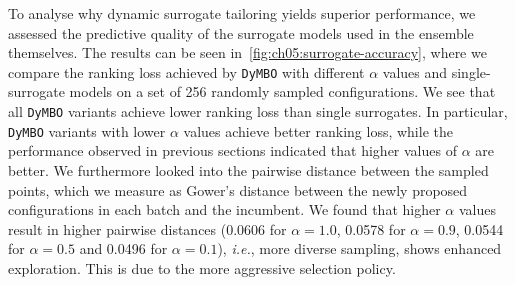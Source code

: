 To analyse why dynamic surrogate tailoring yields superior performance, we assessed the predictive quality of the surrogate models used in the ensemble themselves.
The results can be seen in~\cref{fig:ch05:surrogate-accuracy}, where we compare the ranking loss achieved by \texttt{DyMBO} with different $\alpha$ values and single-surrogate models on a set of 256 randomly sampled configurations. 
We see that all \texttt{DyMBO} variants achieve lower ranking loss than single surrogates.
In particular, \texttt{DyMBO} variants with lower $\alpha$ values achieve better ranking loss, while the performance observed in previous sections indicated that higher values of $\alpha$ are better.
We furthermore looked into the pairwise distance between the sampled points, which we measure as Gower's distance between the newly proposed configurations in each batch and the incumbent. We found that higher $\alpha$ values result in higher pairwise distances (0.0606 for $\alpha=1.0$, 0.0578 for $\alpha=0.9$, 0.0544 for $\alpha=0.5$ and 0.0496 for $\alpha=0.1$), \emph{i.e.}, more diverse sampling, shows enhanced exploration. This is due to the more aggressive selection policy.


